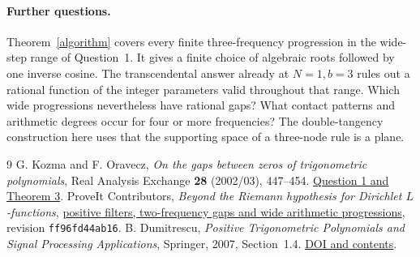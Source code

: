 \documentclass[10pt]{article}
\begin{document}
\paragraph{Further questions.}
Theorem~\ref{algorithm} covers every finite three-frequency progression in the wide-step range of Question~1. It gives a finite choice of algebraic roots followed by one inverse cosine. The transcendental answer already at $N=1,b=3$ rules out a rational function of the integer parameters valid throughout that range. Which wide progressions nevertheless have rational gaps? What contact patterns and arithmetic degrees occur for four or more frequencies? The double-tangency construction here uses that the supporting space of a three-node rule is a plane.

\begin{thebibliography}{9}
 G. Kozma and F. Oravecz,
\emph{On the gaps between zeros of trigonometric polynomials},
Real Analysis Exchange \textbf{28} (2002/03), 447--454.
\href{https://arxiv.org/html/math/0601021v1}{Question 1 and Theorem 3}.
 ProveIt Contributors, \emph{Beyond the Riemann hypothesis for Dirichlet $L$-functions},
\href{https://github.com/VladimirReshetnikov/ProveIt/blob/ff96fd44ab160e65fb8a9d861243828d07c156cf/Analysis/GeneralizedRiemannHypothesis/Article/sections/fil.tex\#L1083-L1197}{positive filters, two-frequency gaps and wide arithmetic progressions}, revision \texttt{ff96fd44ab16}.
 B. Dumitrescu, \emph{Positive Trigonometric Polynomials and Signal Processing Applications}, Springer, 2007, Section~1.4.
\href{https://doi.org/10.1007/978-1-4020-5125-8}{DOI and contents}.
\end{thebibliography}
\end{document}
